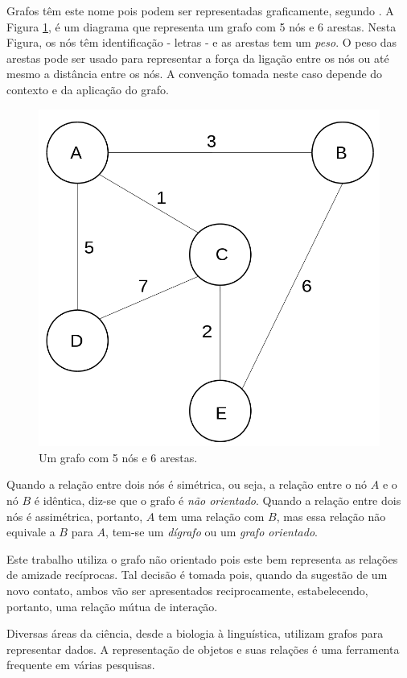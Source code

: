 Grafos têm este nome pois podem ser representadas graficamente, segundo \cite{Bondy08}. A Figura \ref{fig:grafo}, é um diagrama que representa um grafo com 5 nós e 6 arestas. Nesta Figura, os nós têm identificação - letras - e as arestas tem um \emph{peso}. O peso das arestas pode ser usado para representar a força da ligação entre os nós ou até mesmo a distância entre os nós. A convenção tomada neste caso depende do contexto e da aplicação do grafo.

\begin{figure}[!htb]
\centering
\includegraphics[width=12cm]{grafo.png}
\caption{Um grafo com 5 nós e 6 arestas.}
\label{fig:grafo}
\end{figure}

Quando a relação entre dois nós é simétrica, ou seja, a relação entre o nó $A$ e o nó $B$ é idêntica, diz-se que o grafo é \emph{não orientado}. Quando a relação entre dois nós é assimétrica, portanto, $A$ tem uma relação com $B$, mas essa relação não equivale a $B$ para $A$, tem-se um \emph{dígrafo} ou um \emph{grafo orientado}.

Este trabalho utiliza o grafo não orientado pois este bem representa as relações de amizade recíprocas. Tal decisão é tomada pois, quando da sugestão de um novo contato, ambos vão ser apresentados reciprocamente, estabelecendo, portanto, uma relação mútua de interação.

Diversas áreas da ciência, desde a biologia à linguística, utilizam grafos para representar dados. A representação de objetos e suas relações é uma ferramenta frequente em várias pesquisas.

